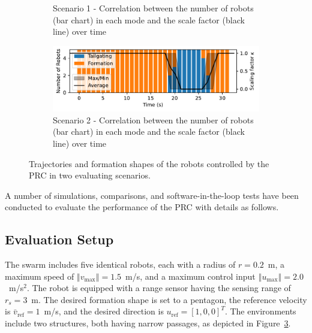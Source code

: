 \begin{figure}
\begin{subfigure}[b]{0.495\textwidth}
    \caption{Scenario 1 - Correlation between the number of  robots (bar chart) in each mode and the scale factor (black line) over time}
    \label{fig:cor1}
    \end{subfigure}
    \begin{subfigure}[b]{0.495\textwidth}
    \includegraphics[width=\textwidth]{paper3/images/correlation_scen2.pdf}
    \caption{Scenario 2 - Correlation between the number of  robots (bar chart) in each mode and the scale factor (black line) over time}
    \label{fig:cor2}
    \end{subfigure}
    \caption{Trajectories and formation shapes of the robots controlled by the PRC in two evaluating scenarios.}
    \label{fig:path}
\end{figure}

A number of simulations, comparisons, and software-in-the-loop tests have been conducted to evaluate the performance of the PRC with details as follows.

\subsection{Evaluation Setup}
The swarm includes five identical robots, each with a radius of $r=0.2$~m, a maximum speed of $\left\Vert v_\text{max}\right\Vert=1.5$~m/s, and a maximum control input $\left\Vert u_\text{max}\right\Vert=2.0$~m/s$^2$. The robot is equipped with a range sensor having the sensing range of $r_s=3$~m. The desired formation shape is set to a pentagon, the reference velocity is $\bar{v}_\text{ref}=1$~m/s, and the desired direction is $u_\text{ref}=[1,0,0]^T$. The environments include two structures, both having narrow passages, as depicted in Figure~\ref{fig:path}.

